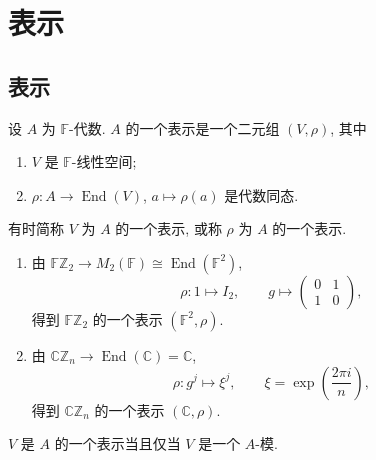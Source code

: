 \section{表示}

\subsection{表示}

\begin{definition}[表示]\label{def:representation}
设 $A$ 为 $\mathbb{F}$-代数. $A$ 的一个表示是一个二元组 $(V,\rho)$, 其中
\begin{enumerate}
  \item $V$ 是 $\mathbb{F}$-线性空间;
  \item $\rho\colon A\to\operatorname{End}(V)$, $a\mapsto\rho(a)$ 是代数同态.
\end{enumerate}
有时简称 $V$ 为 $A$ 的一个表示, 或称 $\rho$ 为 $A$ 的一个表示.
\end{definition}

\begin{example}\label{ex:representation-FZ2}
\mbox{}\par\vspace{-0.2em}
\begin{enumerate}
  \item 由 $\mathbb{F}\mathbb{Z}_2\to M_2(\mathbb{F})\cong\operatorname{End}(\mathbb{F}^2)$,
  \[
    \rho\colon 1\longmapsto I_2,\qquad g\longmapsto\begin{pmatrix}0&1\\1&0\end{pmatrix},
  \]
  得到 $\mathbb{F}\mathbb{Z}_2$ 的一个表示 $(\mathbb{F}^2,\rho)$.
  \item 由 $\mathbb{C}\mathbb{Z}_n\to\operatorname{End}(\mathbb{C})=\mathbb{C}$,
  \[
    \rho\colon g^j\longmapsto\xi^j,\qquad \xi=\exp\left(\frac{2\pi i}{n}\right),
  \]
  得到 $\mathbb{C}\mathbb{Z}_n$ 的一个表示 $(\mathbb{C},\rho)$.
\end{enumerate}
\end{example}

\begin{theorem}\label{thm:rep-is-module}
$V$ 是 $A$ 的一个表示当且仅当 $V$ 是一个 $A$-模.
\end{theorem}

